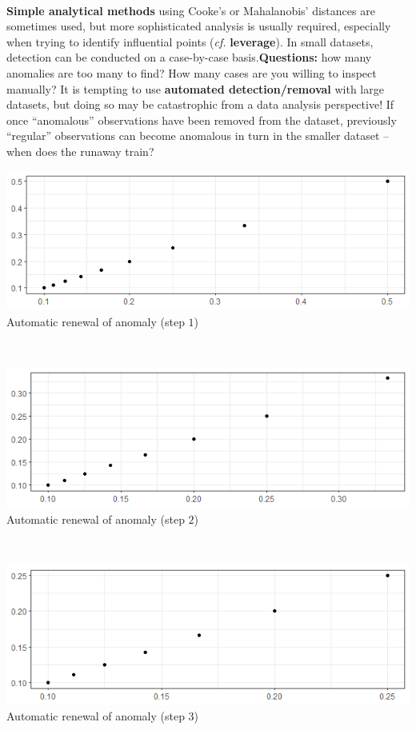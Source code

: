 \documentclass[20pt,landscape,footrule,headrule]{foils}
\newcommand{\newl}{\newline\newline}
\begin{document}
\newpage\ \\ \noindent
\textbf{Simple analytical methods} using Cooke's or Mahalanobis' distances are sometimes used, but more sophisticated analysis is usually required, especially when trying to identify influential points (\textit{cf.} \textbf{leverage}). 
\newl 
In small datasets, detection can be conducted on a case-by-case basis.\newl \textbf{Questions:} how many anomalies are too many to find? How many cases are you willing to inspect manually? 
\newl It is tempting to use \textbf{automated detection/removal} with large datasets, but doing so may be catastrophic from a data analysis perspective!
\newl If once ``anomalous'' observations have been removed from the dataset, previously ``regular'' observations can become anomalous in turn in the smaller dataset -- when does the runaway train?
\newpage\ \\ 
\begin{center}
\includegraphics[width=\textwidth]{Images/ADOA1.png} \\ Automatic renewal of anomaly (step $1$)
\end{center}
\newpage\ \\ 
\begin{center}
\includegraphics[width=\textwidth]{Images/ADOA2.png}\\ Automatic renewal of anomaly (step $2$)
\end{center}
\newpage\ \\ 
\begin{center}
\includegraphics[width=\textwidth]{Images/ADOA3.png}\\ Automatic renewal of anomaly (step $3$)
\end{center}
\end{document}
